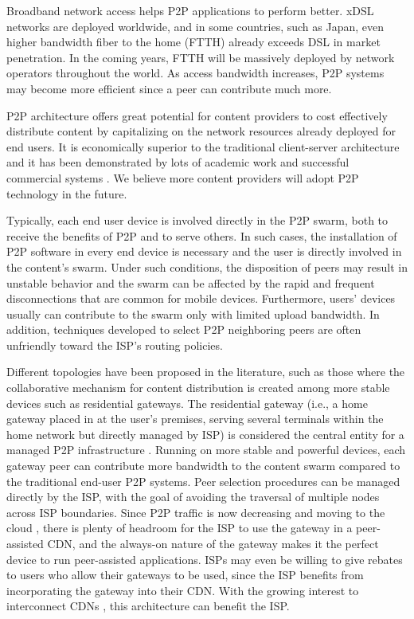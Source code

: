 \documentclass[paper]{ieice}
\begin{document}
Broadband network access helps P2P applications to perform better.
xDSL networks are deployed worldwide, and in some countries, such as
Japan, even higher bandwidth fiber to the home (FTTH) already exceeds
DSL in market penetration.  In the coming years, FTTH will be massively
deployed by network operators throughout the world.  As access
bandwidth increases, P2P systems may become more efficient since a
peer can contribute much more.

P2P architecture offers great potential for content providers to cost
effectively distribute content by capitalizing on the network
resources already deployed for end users.  It is economically superior
to the traditional client-server architecture and it has been
demonstrated by lots of academic work and successful commercial
systems \cite{Yin:2009:DDH:1631272.1631279}.  We believe more content
providers will adopt P2P technology in the future.

Typically, each end user device is involved directly in the P2P swarm,
both to receive the benefits of P2P and to serve others.  In such
cases, the installation of P2P software in every end device is
necessary and the user is directly involved in the content's swarm.
Under such conditions, the disposition of peers may result in unstable
behavior and the swarm can be affected by the rapid and frequent
disconnections that are common for mobile devices.  Furthermore,
users' devices usually can contribute to the swarm only with limited
upload bandwidth.  In addition, techniques developed to select P2P
neighboring peers are often unfriendly toward the ISP's routing
policies.


Different topologies have been proposed in the literature, such as
those where the collaborative mechanism for content distribution is
created among more stable devices such as residential gateways.  The
residential gateway (i.e., a home gateway placed in at the user's
premises, serving several terminals within the home network but
directly managed by ISP) is considered the central entity for a
managed P2P infrastructure
\cite{Misra:2010:IPS:1811099.1811064,Cha:2008:NTP:1855641.1855646}.
Running on more stable and powerful devices, each gateway peer can
contribute more bandwidth to the content swarm compared to the
traditional end-user P2P systems.  Peer selection procedures can be
managed directly by the ISP, with the goal of avoiding the traversal
of multiple nodes across ISP boundaries.  Since P2P traffic is now
decreasing and moving to the cloud
\cite{Labovitz:2010:IIT:2043164.1851194}, there is plenty of headroom
for the ISP to use the gateway in a peer-assisted CDN, and the
always-on nature of the gateway makes it the perfect device to run
peer-assisted applications.  ISPs may even be willing to give rebates
to users who allow their gateways to be used, since the ISP benefits
from incorporating the gateway into their CDN.  With the growing
interest to interconnect CDNs \cite{cdni,oceanproject}, this
architecture can benefit the ISP.
\end{document}
